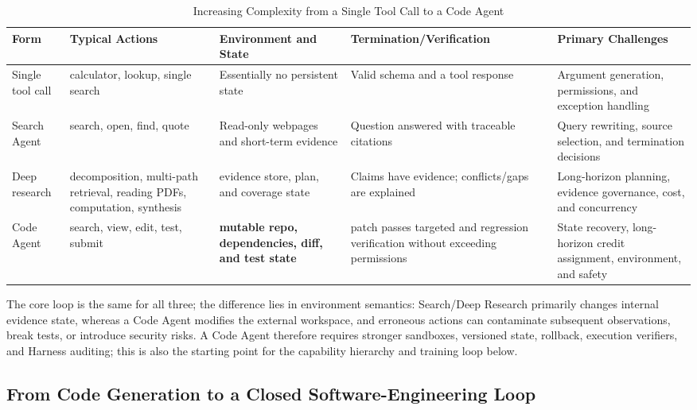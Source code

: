 \documentclass[10pt,a4paper,UTF8,fontset=none]{ctexart}
\begin{document}
\begin{table}[htbp]
\centering
\caption{Increasing Complexity from a Single Tool Call to a Code Agent}
\label{tab:agent-progression}
\small
\begin{tabularx}{\textwidth}{p{2.45cm}YYYY}
\toprule
Form & Typical Actions & Environment and State & Termination/Verification & Primary Challenges \\
\midrule
Single tool call & calculator, lookup, single search & Essentially no persistent state & Valid schema and a tool response & Argument generation, permissions, and exception handling \\
Search Agent & search, open, find, quote & Read-only webpages and short-term evidence & Question answered with traceable citations & Query rewriting, source selection, and termination decisions \\
Deep research & decomposition, multi-path retrieval, reading PDFs, computation, synthesis & evidence store, plan, and coverage state & Claims have evidence; conflicts/gaps are explained & Long-horizon planning, evidence governance, cost, and concurrency \\
Code Agent & search, view, edit, test, submit & \textbf{mutable repo, dependencies, diff, and test state} & patch passes targeted and regression verification without exceeding permissions & State recovery, long-horizon credit assignment, environment, and safety \\
\bottomrule
\end{tabularx}
\end{table}

The core loop is the same for all three; the difference lies in environment semantics: Search/Deep Research primarily changes internal evidence state, whereas a Code Agent modifies the external workspace, and erroneous actions can contaminate subsequent observations, break tests, or introduce security risks. A Code Agent therefore requires stronger sandboxes, versioned state, rollback, execution verifiers, and Harness auditing; this is also the starting point for the capability hierarchy and training loop below.

\subsection{From Code Generation to a Closed Software-Engineering Loop}
\end{document}

